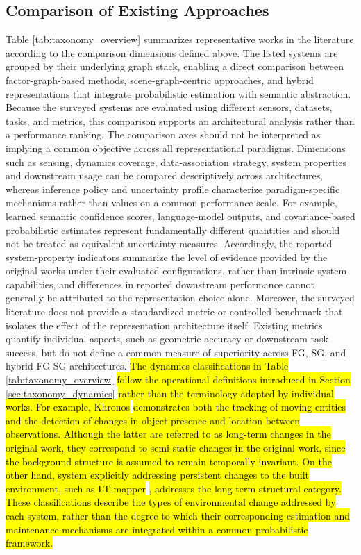 \subsection{Comparison of Existing Approaches}\label{sec:taxonomy_taxonomy}
Table \ref{tab:taxonomy_overview} summarizes representative works in the literature according to the comparison dimensions defined above.
The listed systems are grouped by their underlying graph stack, enabling a direct comparison between factor-graph-based methods, scene-graph-centric approaches, and hybrid representations that integrate probabilistic estimation with semantic abstraction.
Because the surveyed systems are evaluated using different sensors, datasets, tasks, and metrics, this comparison supports an architectural analysis rather than a performance ranking. 
The comparison axes should not be interpreted as implying a common objective across all representational paradigms.
Dimensions such as sensing, dynamics coverage, data-association strategy, system properties and downstream usage can be compared descriptively across architectures, whereas inference policy and uncertainty profile characterize paradigm-specific mechanisms rather than values on a common performance scale. 
For example, learned semantic confidence scores, language-model outputs, and covariance-based probabilistic estimates represent fundamentally different quantities and should not be treated as equivalent uncertainty measures.
Accordingly, the reported system-property indicators summarize the level of evidence provided by the original works under their evaluated configurations, rather than intrinsic system capabilities, and differences in reported downstream performance cannot generally be attributed to the representation choice alone.
Moreover, the surveyed literature does not provide a standardized metric or controlled benchmark that isolates the effect of the representation architecture itself.
Existing metrics quantify individual aspects, such as geometric accuracy or downstream task success, but do not define a common measure of superiority across FG, SG, and hybrid FG-SG architectures.
\hl{The dynamics classifications in Table} \ref{tab:taxonomy_overview}\hl{ follow the operational definitions introduced in Section} \ref{sec:taxonomy_dynamics} \hl{ rather than the terminology adopted by individual works. For example, Khronos} \cite{schmid_khronos_2024} \hl{demonstrates both the tracking of moving entities and the detection of changes in object presence and location between observations. 
Although the latter are referred to as long-term changes in the original work, they correspond to semi-static changes in the original work, since the background structure is assumed to remain temporally invariant. On the other hand, system explicitly addressing persistent changes to the built environment, such as LT-mapper } \cite{kim_lt-mapper_2022} \hl{, addresses the long-term structural category.
These classifications describe the types of environmental change addressed by each system,  rather than the degree to which their corresponding estimation and maintenance mechanisms are integrated within a common probabilistic framework.}

